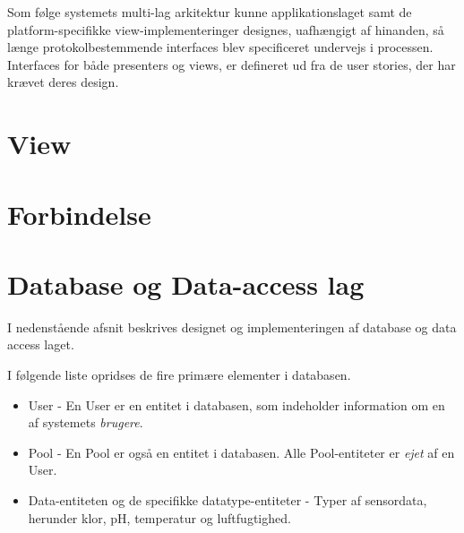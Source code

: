 Som følge systemets multi-lag arkitektur kunne applikationslaget samt de platform-specifikke view-implementeringer
designes, uafhængigt af hinanden, så længe protokolbestemmende interfaces blev specificeret undervejs i processen. Interfaces for både presenters og views, er defineret ud fra de user stories, der har krævet deres design.



\section{View}







\section{Forbindelse}



\section{Database og Data-access lag}\label{sec:designdatabase}
I nedenstående afsnit beskrives designet og implementeringen af database og data access laget.

I følgende liste opridses de fire primære elementer i databasen.

\begin{itemize}
	\item User - En User er en entitet i databasen, som indeholder information om en af systemets \textit{brugere}.
	\item Pool - En Pool er også en entitet i databasen. Alle Pool-entiteter er \textit{ejet} af en User.
	\item Data-entiteten og de specifikke datatype-entiteter - Typer af sensordata, herunder klor, pH, temperatur og luftfugtighed.
\end{itemize}



